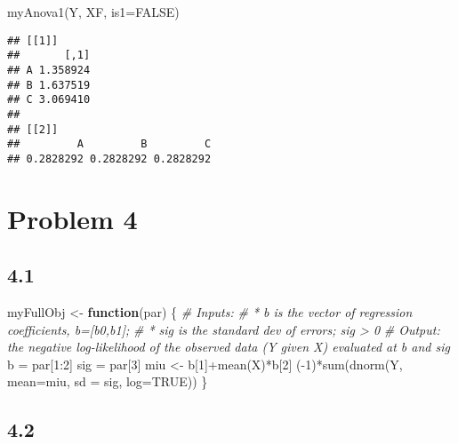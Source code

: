 \documentclass[
  11pt,
]{article}
\newenvironment{Shaded}{\begin{snugshade}}{\end{snugshade}}
\newcommand{\AttributeTok}[1]{\textcolor[rgb]{0.77,0.63,0.00}{#1}}
\newcommand{\CommentTok}[1]{\textcolor[rgb]{0.56,0.35,0.01}{\textit{#1}}}
\newcommand{\ConstantTok}[1]{\textcolor[rgb]{0.00,0.00,0.00}{#1}}
\newcommand{\ControlFlowTok}[1]{\textcolor[rgb]{0.13,0.29,0.53}{\textbf{#1}}}
\newcommand{\DecValTok}[1]{\textcolor[rgb]{0.00,0.00,0.81}{#1}}
\newcommand{\FunctionTok}[1]{\textcolor[rgb]{0.00,0.00,0.00}{#1}}
\newcommand{\NormalTok}[1]{#1}
\newcommand{\OtherTok}[1]{\textcolor[rgb]{0.56,0.35,0.01}{#1}}
\newcommand{\SpecialCharTok}[1]{\textcolor[rgb]{0.00,0.00,0.00}{#1}}
\begin{document}
\begin{Shaded}
\begin{Highlighting}[]
\FunctionTok{myAnova1}\NormalTok{(Y, XF, }\AttributeTok{is1=}\ConstantTok{FALSE}\NormalTok{)}
\end{Highlighting}
\end{Shaded}

\begin{verbatim}
## [[1]]
##       [,1]
## A 1.358924
## B 1.637519
## C 3.069410
## 
## [[2]]
##         A         B         C 
## 0.2828292 0.2828292 0.2828292
\end{verbatim}

\hypertarget{problem-4}{%
\section{Problem 4}\label{problem-4}}

\hypertarget{section-3}{%
\subsection{4.1}\label{section-3}}

\begin{Shaded}
\begin{Highlighting}[]
\NormalTok{myFullObj }\OtherTok{\textless{}{-}} \ControlFlowTok{function}\NormalTok{(par) \{}
\CommentTok{\# Inputs:}
\CommentTok{\# * b is the vector of regression coefficients, b=[b0,b1];}
\CommentTok{\# * sig is the standard dev of errors; sig \textgreater{} 0}
\CommentTok{\# Output: the negative log{-}likelihood of the observed data (Y given X) evaluated at b and sig}
\NormalTok{  b }\OtherTok{=}\NormalTok{ par[}\DecValTok{1}\SpecialCharTok{:}\DecValTok{2}\NormalTok{]}
\NormalTok{  sig }\OtherTok{=}\NormalTok{ par[}\DecValTok{3}\NormalTok{]}
\NormalTok{  miu }\OtherTok{\textless{}{-}}\NormalTok{ b[}\DecValTok{1}\NormalTok{]}\SpecialCharTok{+}\FunctionTok{mean}\NormalTok{(X)}\SpecialCharTok{*}\NormalTok{b[}\DecValTok{2}\NormalTok{]}
\NormalTok{  (}\SpecialCharTok{{-}}\DecValTok{1}\NormalTok{)}\SpecialCharTok{*}\FunctionTok{sum}\NormalTok{(}\FunctionTok{dnorm}\NormalTok{(Y, }\AttributeTok{mean=}\NormalTok{miu, }\AttributeTok{sd =}\NormalTok{ sig, }\AttributeTok{log=}\ConstantTok{TRUE}\NormalTok{))}
\NormalTok{\}}
\end{Highlighting}
\end{Shaded}

\hypertarget{section-4}{%
\subsection{4.2}\label{section-4}}
\end{document}
